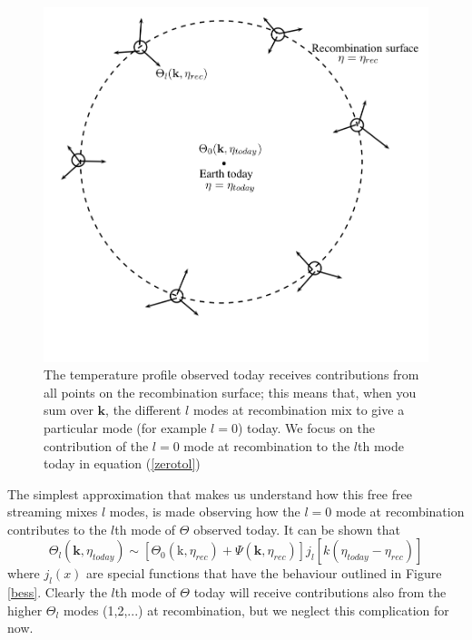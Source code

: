 \begin{figure}
\begin{center}
\includegraphics[scale=0.6]{CMB/stream}
\end{center}
\caption{The temperature profile observed today receives contributions from all points on the recombination surface; this means that, when you sum over
$\mathbf{k}$, the different $l$ modes at recombination mix to give a particular mode (for example $l=0$) today. We focus on the contribution of the $l=0$ mode at recombination to the $l$th mode today in equation (\ref{zerotol})}
\label{convol}
\end{figure}
The simplest approximation that makes us understand how this free free streaming mixes $l$ modes, is made observing how the  $l=0$ mode at recombination contributes to the $l$th mode of $\Theta$ observed today. It can be shown that 
\begin{equation}
\label{zerotol}
\Theta_l(\mathbf{k},\eta_{today})\sim[\Theta_0(\mathrm{k},\eta_{rec})+\Psi(\mathbf{k},\eta_{rec})]j_l[k(\eta_{today}-\eta_{rec})]
\end{equation} 
where $j_l(x)$ are special functions that have the behaviour outlined in Figure \ref{bess}. Clearly the $l$th mode of $\Theta$ today will receive contributions also from the higher $\Theta_l$ modes (1,2,...) at recombination, but we neglect this complication for now. 
